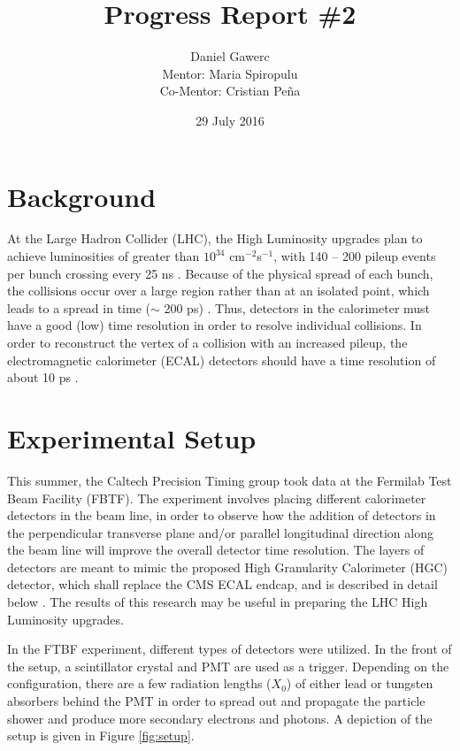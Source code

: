 \documentclass[12pt]{article}
\begin{document}
\author{Daniel Gawerc\\Mentor: Maria Spiropulu\\Co-Mentor: Cristian Peña}
\title{Progress Report \#2}
\date{29 July 2016}
\maketitle

\section{Background}
At the Large Hadron Collider (LHC), the High Luminosity upgrades plan to achieve luminosities of greater than $10^{34}$ cm$^{-2}$s$^{-1}$, with 140 – 200 pileup events per bunch crossing every 25 ns \cite{P1}. 
Because of the physical spread of each bunch, the collisions occur over a large region rather than at an isolated point, which leads to a spread in time ($\sim$ 200 ps) \cite{P1}. 
Thus, detectors in the calorimeter must have a good (low) time resolution in order to resolve individual collisions. 
In order to reconstruct the vertex of a collision with an increased pileup, the electromagnetic calorimeter (ECAL) detectors should have a time resolution of about 10 ps \cite{P1}.


\section{Experimental Setup}
This summer, the Caltech Precision Timing group took data at the Fermilab Test Beam Facility (FBTF). 
The experiment involves placing different calorimeter detectors in the beam line, in order to observe how the addition of detectors in the perpendicular transverse plane and/or parallel longitudinal direction along the beam line will improve the overall detector time resolution. 
The layers of detectors are meant to mimic the proposed High Granularity Calorimeter (HGC) detector, which shall replace the CMS ECAL endcap, and is described in detail below \cite{P2}. 
The results of this research may be useful in preparing the LHC High Luminosity upgrades.

In the FTBF experiment, different types of detectors were utilized. 
In the front of the setup, a scintillator crystal and PMT are used as a trigger. 
Depending on the configuration, there are a few radiation lengths ($X_0$) of either lead or tungsten absorbers behind the PMT in order to spread out and propagate the particle shower and produce more secondary electrons and photons. 
A depiction of the setup is given in Figure \ref{fig:setup}.
\end{document}
